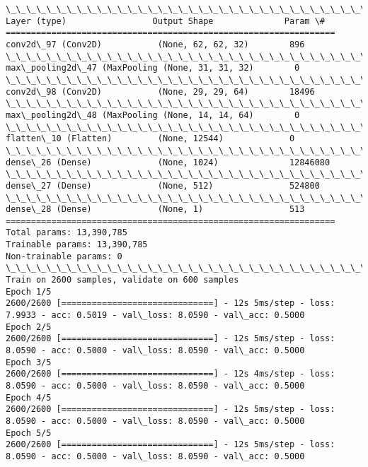 \documentclass[11pt]{article}
\begin{document}
    \begin{Verbatim}[commandchars=\\\{\}]
\_\_\_\_\_\_\_\_\_\_\_\_\_\_\_\_\_\_\_\_\_\_\_\_\_\_\_\_\_\_\_\_\_\_\_\_\_\_\_\_\_\_\_\_\_\_\_\_\_\_\_\_\_\_\_\_\_\_\_\_\_\_\_\_\_
Layer (type)                 Output Shape              Param \#   
=================================================================
conv2d\_97 (Conv2D)           (None, 62, 62, 32)        896       
\_\_\_\_\_\_\_\_\_\_\_\_\_\_\_\_\_\_\_\_\_\_\_\_\_\_\_\_\_\_\_\_\_\_\_\_\_\_\_\_\_\_\_\_\_\_\_\_\_\_\_\_\_\_\_\_\_\_\_\_\_\_\_\_\_
max\_pooling2d\_47 (MaxPooling (None, 31, 31, 32)        0         
\_\_\_\_\_\_\_\_\_\_\_\_\_\_\_\_\_\_\_\_\_\_\_\_\_\_\_\_\_\_\_\_\_\_\_\_\_\_\_\_\_\_\_\_\_\_\_\_\_\_\_\_\_\_\_\_\_\_\_\_\_\_\_\_\_
conv2d\_98 (Conv2D)           (None, 29, 29, 64)        18496     
\_\_\_\_\_\_\_\_\_\_\_\_\_\_\_\_\_\_\_\_\_\_\_\_\_\_\_\_\_\_\_\_\_\_\_\_\_\_\_\_\_\_\_\_\_\_\_\_\_\_\_\_\_\_\_\_\_\_\_\_\_\_\_\_\_
max\_pooling2d\_48 (MaxPooling (None, 14, 14, 64)        0         
\_\_\_\_\_\_\_\_\_\_\_\_\_\_\_\_\_\_\_\_\_\_\_\_\_\_\_\_\_\_\_\_\_\_\_\_\_\_\_\_\_\_\_\_\_\_\_\_\_\_\_\_\_\_\_\_\_\_\_\_\_\_\_\_\_
flatten\_10 (Flatten)         (None, 12544)             0         
\_\_\_\_\_\_\_\_\_\_\_\_\_\_\_\_\_\_\_\_\_\_\_\_\_\_\_\_\_\_\_\_\_\_\_\_\_\_\_\_\_\_\_\_\_\_\_\_\_\_\_\_\_\_\_\_\_\_\_\_\_\_\_\_\_
dense\_26 (Dense)             (None, 1024)              12846080  
\_\_\_\_\_\_\_\_\_\_\_\_\_\_\_\_\_\_\_\_\_\_\_\_\_\_\_\_\_\_\_\_\_\_\_\_\_\_\_\_\_\_\_\_\_\_\_\_\_\_\_\_\_\_\_\_\_\_\_\_\_\_\_\_\_
dense\_27 (Dense)             (None, 512)               524800    
\_\_\_\_\_\_\_\_\_\_\_\_\_\_\_\_\_\_\_\_\_\_\_\_\_\_\_\_\_\_\_\_\_\_\_\_\_\_\_\_\_\_\_\_\_\_\_\_\_\_\_\_\_\_\_\_\_\_\_\_\_\_\_\_\_
dense\_28 (Dense)             (None, 1)                 513       
=================================================================
Total params: 13,390,785
Trainable params: 13,390,785
Non-trainable params: 0
\_\_\_\_\_\_\_\_\_\_\_\_\_\_\_\_\_\_\_\_\_\_\_\_\_\_\_\_\_\_\_\_\_\_\_\_\_\_\_\_\_\_\_\_\_\_\_\_\_\_\_\_\_\_\_\_\_\_\_\_\_\_\_\_\_
Train on 2600 samples, validate on 600 samples
Epoch 1/5
2600/2600 [==============================] - 12s 5ms/step - loss: 7.9933 - acc: 0.5019 - val\_loss: 8.0590 - val\_acc: 0.5000
Epoch 2/5
2600/2600 [==============================] - 12s 5ms/step - loss: 8.0590 - acc: 0.5000 - val\_loss: 8.0590 - val\_acc: 0.5000
Epoch 3/5
2600/2600 [==============================] - 12s 4ms/step - loss: 8.0590 - acc: 0.5000 - val\_loss: 8.0590 - val\_acc: 0.5000
Epoch 4/5
2600/2600 [==============================] - 12s 5ms/step - loss: 8.0590 - acc: 0.5000 - val\_loss: 8.0590 - val\_acc: 0.5000
Epoch 5/5
2600/2600 [==============================] - 12s 5ms/step - loss: 8.0590 - acc: 0.5000 - val\_loss: 8.0590 - val\_acc: 0.5000

    \end{Verbatim}
\end{document}
